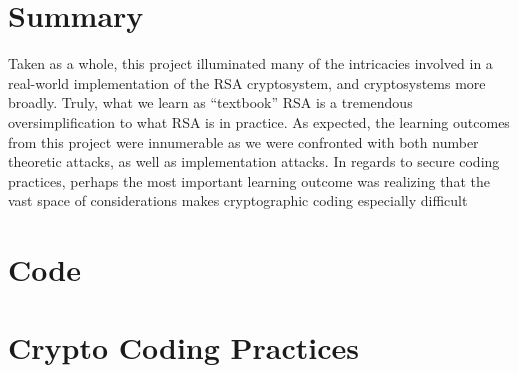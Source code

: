\documentclass[a4paper]{article}
\begin{document}
\section{Summary}

Taken as a whole, this project illuminated many of the intricacies involved in a real-world implementation of the RSA cryptosystem, and cryptosystems more broadly. Truly, what we learn as ``textbook'' RSA is a tremendous oversimplification to what RSA is in practice. As expected, the learning outcomes from this project were innumerable as we were confronted with both number theoretic attacks, as well as implementation attacks. In regards to secure coding practices, perhaps the most
important learning outcome was realizing that the vast space of considerations makes cryptographic coding especially difficult




\appendix

\section{Code}








\section{Crypto Coding Practices}
\end{document}
